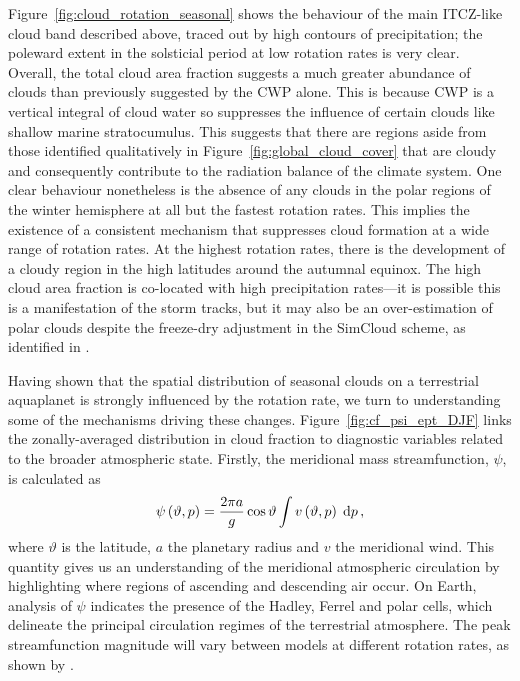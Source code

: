 Figure~\ref{fig:cloud_rotation_seasonal} shows the behaviour of the main ITCZ-like cloud band described above, traced out by high contours of precipitation; the poleward extent in the solsticial period at low rotation rates is very clear. Overall, the total cloud area fraction suggests a much greater abundance of clouds than previously suggested by the CWP alone. This is because CWP is a vertical integral of cloud water so suppresses the influence of certain clouds like shallow marine stratocumulus. This suggests that there are regions aside from those identified qualitatively in Figure~\ref{fig:global_cloud_cover} that are cloudy and consequently contribute to the radiation balance of the climate system. One clear behaviour nonetheless is the absence of any clouds in the polar regions of the winter hemisphere at all but the fastest rotation rates. This implies the existence of a consistent mechanism that suppresses cloud formation at a wide range of rotation rates. At the highest rotation rates, there is the development of a cloudy region in the high latitudes around the autumnal equinox. The high cloud area fraction is co-located with high precipitation rates---it is possible this is a manifestation of the storm tracks, but it may also be an over-estimation of polar clouds despite the freeze-dry adjustment in the SimCloud scheme, as identified in \citet{liu2021-SimCloud}.


Having shown that the spatial distribution of seasonal clouds on a terrestrial aquaplanet is strongly influenced by the rotation rate, we turn to understanding some of the mechanisms driving these changes. Figure~\ref{fig:cf_psi_ept_DJF} links the zonally-averaged distribution in cloud fraction to diagnostic variables related to the broader atmospheric state. Firstly, the meridional mass streamfunction, $\psi$, is calculated as 
\begin{equation}\label{eq:massstreamfunction}
    \psi\left(\vartheta,p\right) = \frac{2\pi a}{g} \cos\vartheta \int v\left(\vartheta,p\right) \;\dff p \,,
\end{equation}
where $\vartheta$ is the latitude, $a$ the planetary radius and $v$ the meridional wind. This quantity gives us an understanding of the meridional atmospheric circulation by highlighting where regions of ascending and descending air occur. On Earth, analysis of $\psi$ indicates the presence of the Hadley, Ferrel and polar cells, which delineate the principal circulation regimes of the terrestrial atmosphere. The peak streamfunction magnitude will vary between models at different rotation rates, as shown by \citet{kaspi2015-ATMOSPHERIC}. 

